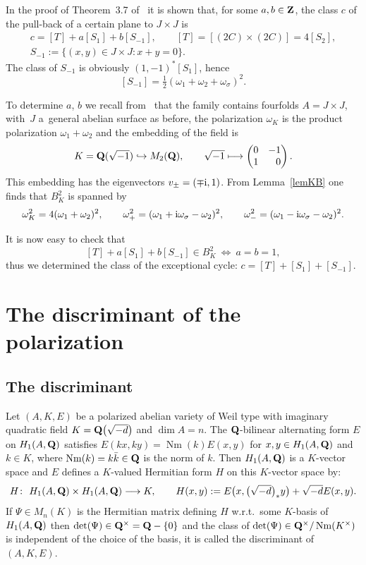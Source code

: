 \documentclass[10pt,a4paper]{amsart}
\numberwithin{equation}{section}
\begin{document}
In the proof of Theorem~3.7 of~\cite{vG} it is shown that, for some $a,b\in{\bf Z}$,
the class $c$ of the pull-back of a certain plane to $J\times J$ is
\begin{gather*}
c = [T]+a[S_1]+b[S_{-1}],\qquad
[T] = [(2C)\times(2C)]=4[S_2],\\
S_{-1} := \{(x,y)\in J\times J\colon x+y=0\}.
\end{gather*}
The class of $S_{-1}$ is obviously $(1,-1)^*[S_1]$, hence
\[
[S_{-1}]=\tfrac{1}{2}(\omega_1+\omega_2+\omega_\sigma)^2.
\]

To determine $a$, $b$ we recall from~\cite{vG} that the family contains fourfolds
$A=J\times J$, with~$J$ a~general abelian surface as before, the polarization
$\omega_K$ is the product
polarization $\omega_1+\omega_2$ and
the embedding of the field is
\[
K = {\bf Q}(\sqrt{-1}) \hookrightarrow M_2({\bf Q}),\qquad
\sqrt{-1} \longmapsto \left(\begin{matrix}0&-1\\1&\hphantom{-}0\end{matrix}\right).
\]
This embedding has the eigenvectors $v_\pm=(\mp {\rm i},1)$.
From Lemma~\ref{lemKB} one finds that $B^2_K$ is spanned by
\[
\omega_K^2 = 4(\omega_1+\omega_2)^2,\qquad \omega_+^2 = (\omega_1+{\rm i}\omega_\sigma-\omega_2)^2,\qquad
\omega_-^2 = (\omega_1-{\rm i}\omega_\sigma-\omega_2)^2.
\]

It is now easy to check that
\[
[T]+a[S_1]+b[S_{-1}] \in B^2_K\ \Longleftrightarrow \ a = b =1,
\]
thus we determined the class of the exceptional cycle: $c=[T]+[S_1]+[S_{-1}]$.

\section{The discriminant of the polarization}\label{secdis}

\subsection{The discriminant}
Let $(A,K,E)$ be a polarized abelian variety of Weil type with imaginary quadratic field
$K={\bf Q}\big(\sqrt{-d}\big)$ and $\dim A=n$.
The ${\bf Q}$-bilinear alternating form $E$ on $H_1(A,{\bf Q})$ satisfies
$E(kx,ky)=\operatorname{Nm}(k)E(x,y)$ for $x,y\in H_1(A,{\bf Q})$ and $k\in K$,
where $\operatorname{Nm}(k)=k\bar{k}\in {\bf Q}$ is the norm of $k$.
Then $H_1(A,{\bf Q})$ is a $K$-vector space and
$E$ defines a $K$-valued Hermitian form $H$ on this $K$-vector space by:
\[
H \colon \ H_1(A,{\bf Q})\times H_1(A,{\bf Q}) \longrightarrow K,\qquad
H(x,y) := E\big(x,\big(\sqrt{-d}\big)_*y\big) + \sqrt{-d}E(x,y).
\]
If $\Psi\in M_n(K)$ is the Hermitian matrix defining $H$ w.r.t.\ some $K$-basis of $H_1(A,{\bf Q})$
then $\det(\Psi)\in {\bf Q}^\times={\bf Q}-\{0\}$ and the class
of $\det(\Psi)\in {\bf Q}^\times/\operatorname{Nm}(K^\times)$ is independent of the choice of the basis,
it is called the discriminant of $(A,K,E)$.
\end{document}
